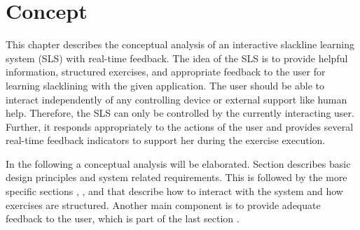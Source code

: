 \chapter{Concept}\label{4_concept}
This chapter describes the conceptual analysis of an interactive slackline learning system (SLS) with real-time feedback. The idea of the SLS is to provide helpful information, structured exercises, and appropriate feedback to the user for learning slacklining with the given application. 
The user should be able to interact independently of any controlling device or external support like human help. Therefore, the SLS can only be controlled by the currently interacting user. Further, it responds appropriately to the actions of the user and provides several real-time feedback indicators to support her during the exercise execution. 

In the following a conceptual analysis will be elaborated. Section \textit{} describes basic design principles and system related requirements. This is followed by the more specific sections \textit{}, \textit{}, and \textit{} that describe how to interact with the system and how exercises are structured. Another main component is to provide adequate feedback to the user, which is part of the last section \textit{}. %






